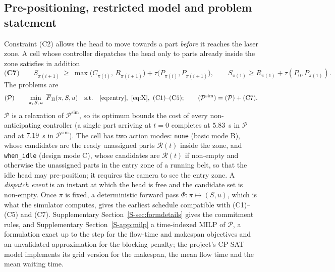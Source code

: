 \documentclass[11pt,a4paper]{article}
\theoremstyle{plain}
\theoremstyle{definition}
\theoremstyle{remark}
\newcommand{\Pb}{\mathcal{P}}
\newcommand{\Psim}{\Pb^{\mathrm{sim}}}
\newcommand{\Fpi}{\overline F_\Pi}
\newcommand{\Supp}[1]{Supplementary Section~\ref{S-#1}}
\begin{document}
\subsection{Pre-positioning, restricted model and problem statement}
Constraint (C2) allows the head to move towards a part \emph{before} it reaches the laser
zone. A cell whose controller dispatches the head only to parts already inside the zone
satisfies in addition
\begin{equation}\label{eq:C7}
\textbf{(C7)}\qquad S_{\pi(i+1)}\ \ge\ \max\bigl(C_{\pi(i)},\,R_{\pi(i+1)}\bigr)+\tau\bigl(P_{\pi(i)},P_{\pi(i+1)}\bigr),
\qquad S_{\pi(1)}\ge R_{\pi(1)}+\tau(P_0,P_{\pi(1)}).
\end{equation}
The problems are
\begin{equation}\label{eq:P}
(\Pb)\qquad \min_{\pi,\,S,\,u}\ \Fpi(\pi,S,u)\quad\text{s.t.}\quad
\eqref{eq:entry},\ \eqref{eq:X},\ \text{(C1)--(C5)};\qquad
(\Psim)=(\Pb)+\text{(C7)}.
\end{equation}
$\Pb$ is a relaxation of $\Psim$, so its optimum bounds the cost of every non-anticipating
controller (a single part arriving at $t=0$ completes at $5.83$~s in $\Pb$ and at $7.19$~s
in $\Psim$). The cell has two action modes: \texttt{none} (basic mode B), whose candidates
are the ready unassigned parts $\mathcal R(t)$ inside the zone, and \texttt{when\_idle}
(design mode C), whose candidates are $\mathcal R(t)$ if non-empty and otherwise the
unassigned parts in the entry zone of a running belt, so that the idle head may
pre-position; it requires the camera to see the entry zone. A \emph{dispatch event} is an
instant at which the head is free and the candidate set is non-empty. Once $\pi$ is fixed,
a deterministic forward pass $\Phi:\pi\mapsto(S,u)$, which is what the simulator computes,
gives the earliest schedule compatible with (C1)--(C5) and (C7). \Supp{sec:formdetails}
gives the commitment rules, and \Supp{app:milp} a time-indexed MILP of $\Pb$, a
formulation exact up to the step for the flow-time and makespan objectives and an
unvalidated approximation for the blocking penalty; the project's CP-SAT model implements
its grid version for the makespan, the mean flow time and the mean waiting time.
\end{document}
